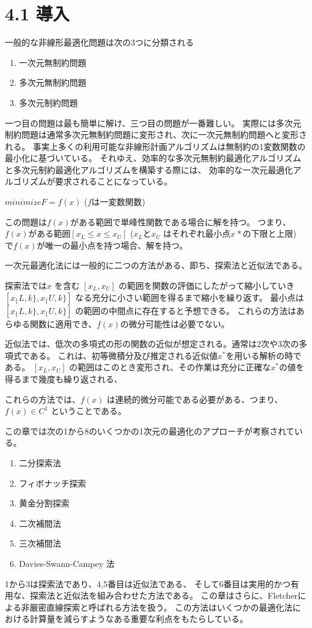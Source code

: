 \section{4.1 導入}\label{4-1-}

一般的な非線形最適化問題は次の3つに分類される

\begin{enumerate}
\tightlist
\item
  一次元無制約問題
\item
  多次元無制約問題
\item
  多次元制約問題
\end{enumerate}

一つ目の問題は最も簡単に解け、三つ目の問題が一番難しい。
実際には多次元制約問題は通常多次元無制約問題に変形され、次に一次元無制約問題へと変形される。
事実上多くの利用可能な非線形計画アルゴリズムは無制約の1変数関数の最小化に基づいている。
それゆえ、効率的な多次元無制約最適化アルゴリズムと多次元制約最適化アルゴリズムを構築する際には、
効率的な一次元最適化アルゴリズムが要求されることになっている。

$ minimize F = f(x) $ ($f$は一変数関数)

この問題は$f(x)$がある範囲で単峰性関数である場合に解を持つ。
つまり、$ f(x) $がある範囲$ [x_L \leq x
\leq x_U] $ ($ x_L $と$ x_U $
はそれぞれ最小点$ x^{}* $の下限と上限) で$ f(x)
$が唯一の最小点を持つ場合、解を持つ。

一次元最適化法には一般的に二つの方法がある、即ち、探索法と近似法である。

探索法では$ x $ を含む $ [x_L , x_U] $
の範囲を関数の評価にしたがって縮小していき $ [ x_\{L,k\} ,
x_\{U,k\} ] $ なる充分に小さい範囲を得るまで縮小を繰り返す。
最小点は $ [ x_\{L,k\} , x_\{U,k\} ] $
の範囲の中間点に存在すると予想できる。
これらの方法はあらゆる関数に適用でき、$ f(x)
$の微分可能性は必要でない。

近似法では、低次の多項式の形の関数の近似が想定される。通常は2次や3次の多項式である。
これは、初等微積分及び推定される近似値$ x^*
$を用いる解析の時である。 $[ x_L , x_U ] $
の範囲はこのとき変形され、その作業は充分に正確な$ x^*
$の値を得るまで幾度も繰り返される、

これらの方法では、$ f(x) $
は連続的微分可能である必要がある、つまり、 $ f(x) \in
C^1 $ ということである。

この章では次の1から8のいくつかの1次元の最適化のアプローチが考察されている。

\begin{enumerate}
\tightlist
\item
  二分探索法
\item
  フィボナッチ探索
\item
  黄金分割探索
\item
  二次補間法
\item
  三次補間法
\item
  Davies-Swann-Campey 法
\end{enumerate}

1から3は探索法であり、4,5番目は近似法である、
そして6番目は実用的かつ有用な、探索法と近似法を組み合わせた方法である。
この章はさらに、Fletcherによる非厳密直線探索と呼ばれる方法を扱う。
この方法はいくつかの最適化法における計算量を減らすようなある重要な利点をもたらしている。
